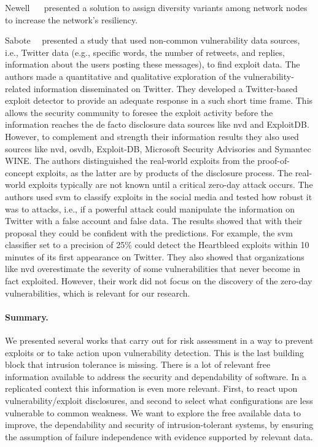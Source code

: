Newell~\etal{} ~\cite{Newell:2015} presented a solution to assign diversity variants among network nodes to increase the network's resiliency.

Sabote~\etal{}~\cite{Sabottke:2015} presented a study that used non-common vulnerability data sources, i.e., Twitter data (e.g., specific words, the number of retweets, and replies, information about
the users posting these messages), to find exploit data. 
The authors made a quantitative and qualitative exploration of the vulnerability-related information disseminated on Twitter.
They developed a Twitter-based exploit detector to provide an adequate response in a such short time frame. 
This allows the security community to foresee the exploit activity before the information reaches the de facto disclosure data sources like \gls{nvd} and ExploitDB.
However, to complement and strength their information results they also used sources like \gls{nvd}, \gls{osvdb}, Exploit-DB, Microsoft Security Advisories and Symantec WINE. 
The authors distinguished the real-world exploits from the proof-of-concept exploits, as the latter are by products of the disclosure process. 
The real-world exploits typically are not known until a critical zero-day attack occurs. 
The authors used \gls{svm} to classify exploits in the social media and tested how robust it was to attacks, i.e., if a powerful attack could manipulate the information on Twitter with a false account and false data. 
The results showed that with their proposal they could be confident with the predictions. 
For example, the \gls{svm} classifier set to a precision of 25\% could detect the Heartbleed exploits within 10 minutes of its first appearance on Twitter. 
They also showed that organizations like \gls{nvd} overestimate the severity of some vulnerabilities that never become in fact exploited.
However, their work did not focus on the discovery of the zero-day vulnerabilities, which is relevant for our research.

\paragraph{Summary.} We presented several works that carry out for risk assessment in a way to prevent exploits or to take action upon vulnerability detection. 
This is the last building block that intrusion tolerance is missing. 
There is a lot of relevant free information available to address the security and dependability of software. 
In a replicated context this information is even more relevant. 
First, to react upon vulnerability/exploit disclosures, and second to select what configurations are less vulnerable to common weakness. 
We want to explore the free available data to improve, the dependability and security of intrusion-tolerant systems, by ensuring the assumption of failure independence with evidence supported by  relevant data.



